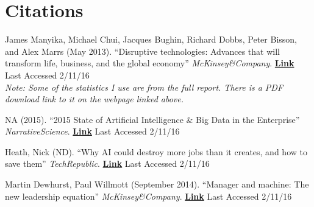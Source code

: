 \documentclass{article}
\begin{document}
  \cleardoublepage

  \restoregeometry

  \section{Citations}
    \begin{enumerate}[ {[}1{]} ]
      \item James Manyika, Michael Chui, Jacques Bughin, Richard Dobbs,
            Peter Bisson, and Alex Marrs (May 2013). ``Disruptive technologies:
            Advances that will transform life, business, and the global economy''
            \textit{McKinsey\&Company}.
            \href{http://www.mckinsey.com/insights/business_technology/disruptive_technologies}{\textbf{Link}}
            Last Accessed 2/11/16 \\
            \textit{Note: Some of the statistics I use are from the full report. There is a PDF download
                    link to it on the webpage linked above.}

      \item NA (2015). ``2015 State of Artificial Intelligence \& Big Data in
            the Enterprise'' \textit{NarrativeScience}.
            \href{https://www.narrativescience.com/filebin/images/Landing_Page/2015_State_of_AI_and_Big_Data_in_the_Enterprise.pdf}
                  {\textbf{Link}} Last Accessed 2/11/16

      \item Heath, Nick (ND). ``Why AI could destroy more jobs than it creates,
            and how to save them'' \textit{TechRepublic}.
            \href{http://www.techrepublic.com/article/ai-is-destroying-more-jobs-than-it-creates-what-it-means-and-how-we-can-stop-it/}
                 {\textbf{Link}} Last Accessed 2/11/16

      \item Martin Dewhurst, Paul Willmott (September 2014). ``Manager and
            machine: The new leadership equation'' \textit{McKinsey\&Company}.
            \href{http://www.mckinsey.com/insights/leading_in_the_21st_century/manager_and_machine}
                 {\textbf{Link}} Last Accessed 2/11/16


    \end{enumerate}

  
\end{document}
